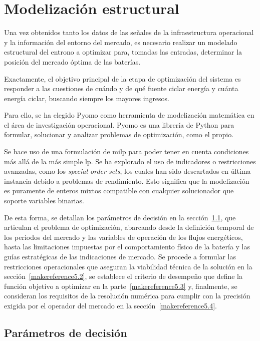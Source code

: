 \cleardoublepage

\chapter{Modelización estructural}
\label{makereference5}

Una vez obtenidos tanto los datos de las señales de la infraestructura operacional y la información del entorno del mercado, es necesario realizar un modelado estructural del entrono a optimizar para, tomadas las entradas, determinar la posición del mercado óptima de las baterías.

Exactamente, el objetivo principal de la etapa de optimización del sistema es responder a las cuestiones de cuándo y de qué fuente ciclar energía y cuánta energía ciclar, buscando siempre los mayores ingresos.

Para ello, se ha elegido Pyomo como herramienta de modelización matemática en el área de investigación operacional. Pyomo es una librería de Python para formular, solucionar y analizar problemas de optimización, como el propio.

Se hace uso de una formulación de \gls{milp} para poder tener en cuenta condiciones más allá de la más simple \gls{lp}. Se ha explorado el uso de indicadores o restricciones avanzadas, como los \textit{special order sets}, los cuales han sido descartados en última instancia debido a problemas de rendimiento. Esto significa que la modelización es puramente de enteros mixtos compatible con cualquier solucionador que soporte variables binarias.

De esta forma, se detallan los parámetros de decisión en la sección~\ref{makereference5.1}, que articulan el problema de optimización, abarcando desde la definición temporal de los periodos del mercado y las variables de operación de los flujos energéticos, hasta las limitaciones impuestas por el comportamiento físico de la batería y las guías estratégicas de las indicaciones de mercado. Se procede a formular las restricciones operacionales que aseguran la viabilidad técnica de la solución en la sección~\ref{makereference5.2}, se establece el criterio de desempeño que define la función objetivo a optimizar en la parte~\ref{makereference5.3} y, finalmente, se consideran los requisitos de la resolución numérica para cumplir con la precisión exigida por el operador del mercado en la sección~\ref{makereference5.4}.

\section{Parámetros de decisión}
\label{makereference5.1}

